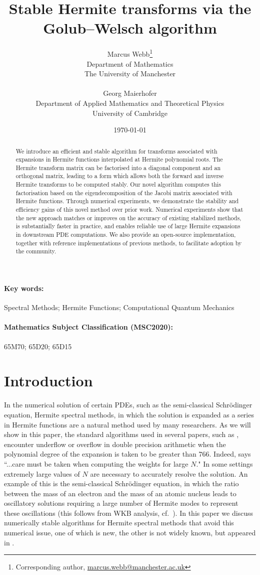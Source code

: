 \documentclass[10pt]{article}
\title{Stable Hermite transforms via the Golub--Welsch algorithm}
\author{Marcus Webb\footnote{Corresponding author, \href{mailto:marcus.webb@manchester.ac.uk}{marcus.webb@manchester.ac.uk}} \\ Department of Mathematics\\ The University of Manchester
\\ \,\\
Georg Maierhofer \\ Department of Applied Mathematics and Theoretical Physics\\ University of Cambridge}
\date{\today}
\numberwithin{theorem}{section}
\begin{document}
\maketitle

\begin{abstract}
We introduce an efficient and stable algorithm for transforms associated with expansions in Hermite functions interpolated at Hermite polynomial roots. The Hermite transform matrix can be factorised into a diagonal component and an orthogonal matrix, leading to a form which allows both the forward and inverse Hermite transforms to be computed stably. Our novel algorithm computes this factorisation based on the eigendecomposition of the Jacobi matrix associated with Hermite functions. Through numerical experiments, we demonstrate the stability and efficiency gains of this novel method over prior work. Numerical experiments show that the new approach matches or improves on the accuracy of existing stabilized methods, is substantially faster in practice, and enables reliable use of large Hermite expansions in downstream PDE computations. We also provide an open-source implementation, together with reference implementations of previous methods, to facilitate adoption by the community.
\end{abstract}
\paragraph{Key words:} Spectral Methods; Hermite Functions; Computational Quantum Mechanics
\paragraph{Mathematics Subject Classification (MSC2020):} 65M70; 65D20; 65D15

\section{Introduction}
In the numerical solution of certain PDEs, such as the semi-classical Schr\"odinger equation, Hermite spectral methods, in which the solution is expanded as a series in Hermite functions are a natural method used by many researchers. As we will show in this paper, the standard algorithms used in several papers, such as \cite{ThCaNe2009,gauckler2011convergence,bao2005fourth, Thalhammer2012}, encounter underflow or overflow in double precision arithmetic when the polynomial degree of the expansion is taken to be greater than $766$. Indeed, \cite{bao2009generalized} says ``...care must be taken when computing the weights for large $N$." In some settings extremely large values of $N$ are necessary to accurately resolve the solution. An example of this is the semi-classical Schr\"odinger equation, in which the ratio between the mass of an electron and the mass of an atomic nucleus leads to oscillatory solutions requiring a large number of Hermite modes to represent these oscillations (this follows from WKB analysis, cf.~\cite{jin2011mathematical}). In this paper we discuss numerically stable algorithms for Hermite spectral methods that avoid this numerical issue, one of which is new, the other is not widely known, but appeared in \cite[Appendix]{bunck2009fast}.
\end{document}

